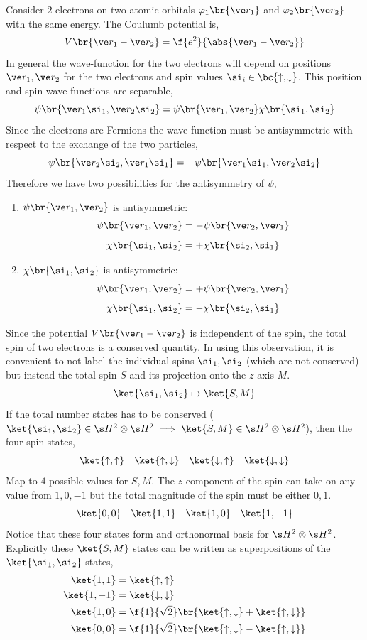 \documentclass{article}
\begin{document}
Consider $2$ electrons on two atomic orbitals $\varphi_1\br{\ve r_1}$ and $\varphi_2\br{\ve r_2}$ with the same energy. The Coulumb potential is,
\[ V\br{\ve r_1 - \ve r_2} = \f{e^2}{\abs{\ve r_1 - \ve r_2}} \]
In general the wave-function for the two electrons will depend on positions $\ve r_1, \ve r_2$ for the two electrons and spin values $\si_i \in \bc{\uparrow, \downarrow}$. This position and spin wave-functions are separable,
\[ \psi \br{\ve r_1 \si_1, \ve r_2 \si_2} = \psi\br{\ve r_1, \ve r_2} \chi \br{\si_1, \si_2} \]
Since the electrons are Fermions the wave-function must be antisymmetric with respect to the exchange of the two particles,
\[ \psi\br{\ve r_2 \si_2, \ve r_1 \si_1} = - \psi\br{\ve r_1 \si_1, \ve r_2\si_2} \]
Therefore we have two possibilities for the antisymmetry of $\psi$,
\begin{enumerate}
    \item $\psi\br{\ve r_1, \ve r_2}$ is antisymmetric:
    \[ \psi\br{\ve r_1, \ve r_2} = -\psi\br{\ve r_2, \ve r_1} \]
    \[ \chi\br{\si_1, \si_2} = +\chi\br{\si_2, \si_1} \]
    \item $\chi\br{\si_1, \si_2}$ is antisymmetric:
    \[ \psi\br{\ve r_1, \ve r_2} = +\psi\br{\ve r_2, \ve r_1} \]
    \[ \chi\br{\si_1, \si_2} = -\chi\br{\si_2, \si_1} \]
\end{enumerate}
Since the potential $V \br{\ve r_1 - \ve r_2}$ is independent of the spin, the total spin of two electrons is a conserved quantity. In using this observation, it is convenient to not label the individual spins $\si_1, \si_2$ (which are not conserved) but instead the total spin $S$ and its projection onto the $z$-axis $M$.
\[ \ket{\si_1, \si_2} \mapsto \ket{S, M} \]
If the total number states has to be conserved ($\ket{\si_1, \si_2} \in \s H^{2} \otimes \s H^{2} \implies \ket{S, M} \in \s H^{2} \otimes \s H^{2}$), then the four spin states,
\[ \ket{\uparrow, \uparrow} \quad\ket{\uparrow, \downarrow} \quad\ket{\downarrow, \uparrow} \quad\ket{\downarrow, \downarrow}  \]
Map to $4$ possible values for $S, M$. The $z$ component of the spin can take on any value from $1, 0, -1$ but the total magnitude of the spin must be either $0,1$.
\[ \ket{0, 0} \quad\ket{1, 1} \quad\ket{1, 0} \quad\ket{1, -1}  \]
Notice that these four states form and orthonormal basis for $\s H^2 \otimes \s H^{2}$. Explicitly these $\ket{S, M}$ states can be written as superpositions of the $\ket{\si_1, \si_2}$ states,
\begin{align*}
    \ket{1,1} & = \ket{\uparrow, \uparrow} \\
    \ket{1, -1} &= \ket{\downarrow, \downarrow} \\
    \ket{1,0} &= \f{1}{\sqrt{2}}\br{\ket{\uparrow, \downarrow} + \ket{\uparrow, \downarrow}} \\
    \ket{0,0} &= \f{1}{\sqrt{2}}\br{\ket{\uparrow, \downarrow} - \ket{\uparrow, \downarrow}}
\end{align*}
\end{document}
